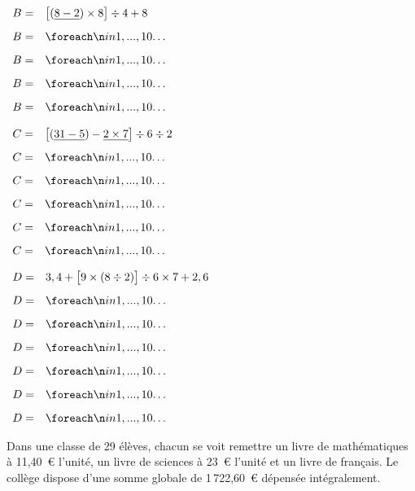 \documentclass[a4paper]{book}
\begin{document}
{\begin{exercice}
\begin{minipage}{0.30\linewidth}
            $\begin{array}{ll}
                B = & \big[(\underline{8 - 2}) \times 8\big] \div 4 + 8 \\[2ex]
                B = & \points[10]\\[2ex]
                B = & \points[10]\\[2ex]
                B = & \points[10]\\[2ex]
                B = & \points[10]
            \end{array}$
        \end{minipage}
        \hfill
        \begin{minipage}[t]{0.30\linewidth}
            $\begin{array}{ll}
                C = & \big[(\underline{31 - 5}) - \underline{2 \times 7}\big] \div 6 \div 2 \\[2ex]
                C = & \points[10] \\[2ex]
                C = & \points[10] \\[2ex]
                C = & \points[10] \\[2ex]
                C = & \points[10] \\[2ex]
                C = & \points[10]
            \end{array}$
        \end{minipage}
        \hfill
        \begin{minipage}[t]{0.30\linewidth}
            $\begin{array}{ll}
                D = & 3,4 + \big[9 \times (8 \div 2)\big] \div 6 \times 7 + 2,6 \\[2ex]
                D = & \points[10] \\[2ex]
                D = & \points[10] \\[2ex]
                D = & \points[10] \\[2ex]
                D = & \points[10] \\[2ex]
                D = & \points[10] \\[2ex]
                D = & \points[10]
            \end{array}$
        \end{minipage}
    \end{exercice}


    \begin{exercice}
        Dans une classe de 29 élèves, chacun se voit remettre un livre de mathématiques à 11,40~\euro \; l'unité, un livre de sciences à 23~\euro \; l'unité et un livre de français. Le collège dispose d'une somme globale de 1\,722,60~\euro \; dépensée intégralement.


\end{exercice}}
\end{document}
